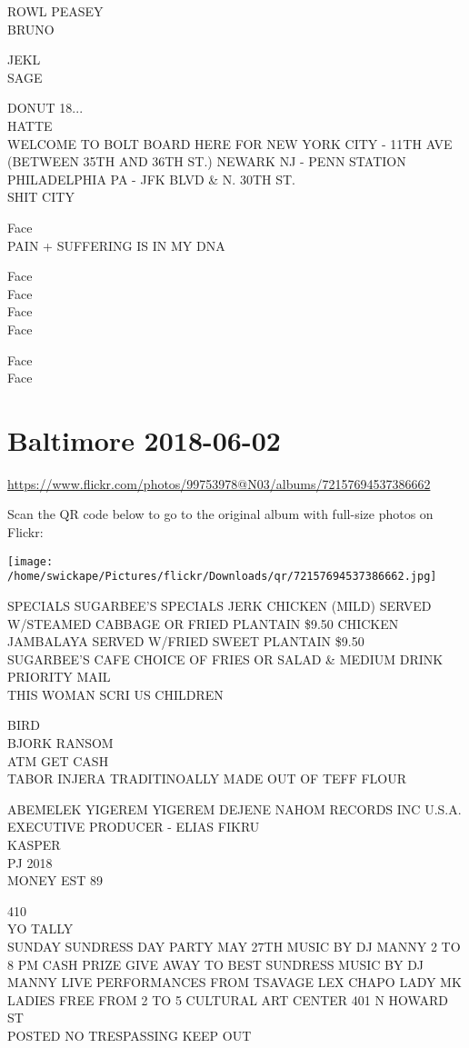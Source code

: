 \documentclass[10pt,letterpaper]{article}
\begin{document}
ROWL PEASEY\\
BRUNO

JEKL\\
SAGE

DONUT 18...\\
HATTE\\
WELCOME TO BOLT BOARD HERE FOR NEW YORK CITY {-} 11TH AVE (BETWEEN 35TH AND 36TH ST.) NEWARK NJ {-} PENN STATION PHILADELPHIA PA {-} JFK BLVD \& N. 30TH ST.\\
SHIT CITY

Face\\
PAIN + SUFFERING IS IN MY DNA

Face\\
Face\\
Face\\
Face

Face\\
Face
\pagebreak

\section*{Baltimore 2018-06-02}

\url{https://www.flickr.com/photos/99753978@N03/albums/72157694537386662}

Scan the QR code below to go to the original album with full-size photos on Flickr:

\texttt{[image: /home/swickape/Pictures/flickr/Downloads/qr/72157694537386662.jpg]}
\pagebreak

SPECIALS SUGARBEE'S SPECIALS JERK CHICKEN (MILD) SERVED W/STEAMED CABBAGE OR FRIED PLANTAIN \$9.50 CHICKEN JAMBALAYA SERVED W/FRIED SWEET PLANTAIN \$9.50\\
SUGARBEE'S CAFE CHOICE OF FRIES OR SALAD \& MEDIUM DRINK\\
PRIORITY MAIL\\
THIS WOMAN SCRI US CHILDREN

BIRD\\
BJORK RANSOM\\
ATM GET CASH\\
TABOR INJERA TRADITINOALLY MADE OUT OF TEFF FLOUR

ABEMELEK YIGEREM YIGEREM DEJENE NAHOM RECORDS INC U.S.A. EXECUTIVE PRODUCER {-} ELIAS FIKRU\\
KASPER\\
PJ 2018\\
MONEY EST 89

410\\
YO TALLY\\
SUNDAY SUNDRESS DAY PARTY MAY 27TH MUSIC BY DJ MANNY 2 TO 8 PM CASH PRIZE GIVE AWAY TO BEST SUNDRESS MUSIC BY DJ MANNY LIVE PERFORMANCES FROM TSAVAGE LEX CHAPO LADY MK LADIES FREE FROM 2 TO 5 CULTURAL ART CENTER 401 N HOWARD ST\\
POSTED NO TRESPASSING KEEP OUT
\end{document}

